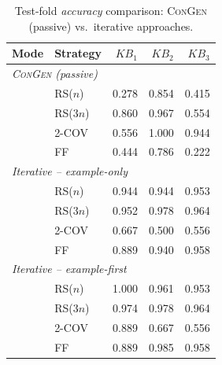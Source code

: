 \begin{table}[htbp]
\centering
\caption{Test-fold \textit{accuracy} comparison: \textsc{ConGen} (passive) vs.\ iterative approaches.}
\label{tab:iterative_accuracy}
\begin{tabular}{llrrr}
\toprule
Mode & Strategy & $KB_1$ & $KB_2$ & $KB_3$ \\
\midrule
\multicolumn{5}{l}{\textit{\textsc{ConGen} (passive)}} \\
 & RS($n$)  & 0.278 & 0.854 & 0.415 \\
 & RS($3n$) & 0.860 & 0.967 & 0.554 \\
 & 2-COV    & 0.556 & 1.000 & 0.944 \\
 & FF       & 0.444 & 0.786 & 0.222 \\
\midrule
\multicolumn{5}{l}{\textit{Iterative -- example-only}} \\
 & RS($n$)  & 0.944 & 0.944 & 0.953 \\
 & RS($3n$) & 0.952 & 0.978 & 0.964 \\
 & 2-COV    & 0.667 & 0.500 & 0.556 \\
 & FF       & 0.889 & 0.940 & 0.958 \\
\midrule
\multicolumn{5}{l}{\textit{Iterative -- example-first}} \\
 & RS($n$)  & 1.000 & 0.961 & 0.953 \\
 & RS($3n$) & 0.974 & 0.978 & 0.964 \\
 & 2-COV    & 0.889 & 0.667 & 0.556 \\
 & FF       & 0.889 & 0.985 & 0.958 \\
\bottomrule
\end{tabular}
\end{table}

